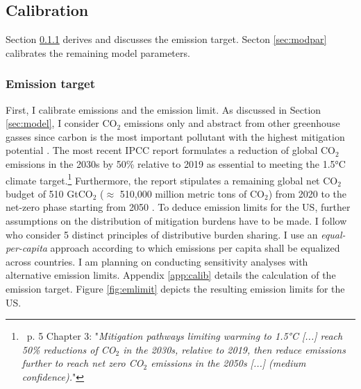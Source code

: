 \subsection{Calibration}\label{sec:calib}

Section \ref{sec:ems} derives and discusses the emission target. 
Secton \ref{sec:modpar} calibrates the remaining model parameters.

\subsubsection{Emission target}\label{sec:ems}
First, I calibrate emissions and the emission limit. As discussed in Section \ref{sec:model},  I consider CO$_2$ emissions only and abstract from other greenhouse gasses since carbon is the most important pollutant with the highest mitigation potential \citep[p.29]{IPCC2022}.
The most recent IPCC report \citep{IPCC2022} formulates a reduction of global CO$_2$ emissions in the 2030s by 50\% relative to 2019  as essential to meeting the 1.5°C climate target.\footnote{\ p. 5 Chapter 3: "\textit{Mitigation pathways limiting warming to 1.5°C [...] reach 50\% reductions of CO$_2$ in the 2030s, relative to 2019, then reduce emissions further to reach net zero CO$_2$ emissions in the 2050s [...] (\textnormal{medium confidence}).}"}  Furthermore, the report stipulates a remaining global net CO$_2$ budget of 510 GtCO$_2$ ($\approx$ 510,000 million metric tons of CO$_2$) from 2020 to the net-zero phase starting from 2050 \citep[p.5, Chapter 3]{IPCC2022}. 
To deduce emission limits for the US, further assumptions on the distribution of mitigation burdens have to be made. I follow \cite{RobiouDuPont2017EquitableGoals} who consider 5 distinct principles of distributive burden sharing. I use an \textit{equal-per-capita} approach according to which emissions per capita shall be equalized across countries. 
I am planning on conducting sensitivity analyses with alternative emission limits. Appendix \ref{app:calib} details the calculation of the emission target. 
Figure \ref{fig:emlimit}  depicts the resulting emission limits for the US.

